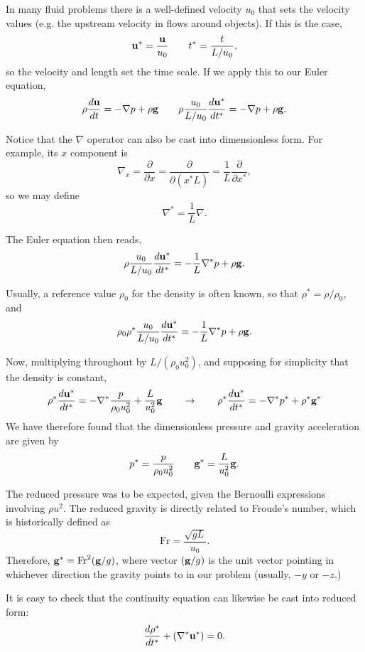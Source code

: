 In many fluid problems there is a well-defined velocity $u_0$ that
sets the velocity values (e.g. the upstream velocity in flows around
objects). If this is the case,
\[
\mathbf{u}^* = \frac{\mathbf{u}}{u_0} \qquad
t^*=\frac{t}{L/u_0} ,
\]
so the velocity and length set the time scale. If we apply this to
our Euler equation,
\[
\rho \frac{d\mathbf{u} }{dt} =
- \nabla p 
+ \rho \mathbf{g}  \qquad
\rho \frac{u_0}{L/u_0} \frac{d\mathbf{u}^* }{dt^* } =
- \nabla p 
+ \rho \mathbf{g} .
\]

Notice that the $\nabla$ operator can also be cast into dimensionless
form. For example, its $x$ component is
\[
\nabla_x = \frac{\partial}{\partial x} = \frac{\partial}{\partial (x^* L) } =
\frac{ 1 }{ L } \frac{\partial}{\partial x^* },
\]
so we may define
\[
\nabla^* = \frac{ 1 }{ L } \nabla.
\]

The Euler equation then reads,
\[
\rho \frac{u_0}{L/u_0} \frac{d\mathbf{u}^* }{dt^* } =
- \frac{ 1 }{ L } \nabla^* p 
+ \rho \mathbf{g} .
\]

Usually, a reference value $\rho_0$ for the density is often known, so
that $\rho^* = \rho / \rho_0$, and
\[
\rho_0 \rho^* \frac{u_0}{L/u_0} \frac{d\mathbf{u}^* }{dt^* } =
- \frac{ 1 }{ L } \nabla^* p 
+ \rho \mathbf{g} .
\]


Now, multiplying throughout by $L/(\rho_0 u_0^2)$, and supposing for simplicity
that the density is constant,
\begin{equation}
  \label{eq:Euler_just_before_adim}
\rho^*
\frac{d\mathbf{u}^* }{dt^* } =
-  \nabla^* \frac{ p }{ \rho_0 u_0^2 } 
+  \frac{ L }{ u_0^2 } \mathbf{g} \qquad \to \qquad
\rho^* \frac{d\mathbf{u}^* }{dt^* } =
-  \nabla^* p^*
+  \rho^* \mathbf{g}^* 
\end{equation}
We have therefore found that the dimensionless pressure and gravity
acceleration are given by
\[
p^*= \frac{ p }{ \rho_0 u_0^2 } \qquad
\mathbf{g}^* = \frac{ L }{ u_0^2 } \mathbf{g} .
\]

The reduced pressure was to be expected, given the Bernoulli
expressions involving $\rho u^2$. The reduced gravity is directly
related to Froude's number, which is historically defined as
\[
\mathrm{Fr}=\frac{ \sqrt{gL}}{u_0}.
\]
Therefore, $ \mathbf{g}^* = \mathrm{Fr}^2 (\mathbf{g}/g) $, where vector $(\mathbf{g}/g)
$ is the unit vector pointing in whichever direction the gravity
points to in our problem (usually, $-y$ or $-z$.)


It is easy to check that the continuity equation can likewise be
cast into reduced form:
\[
\frac{d\rho^* }{dt^* }+
 ( \nabla^* \mathbf{u}^*) = 0 .
\]

